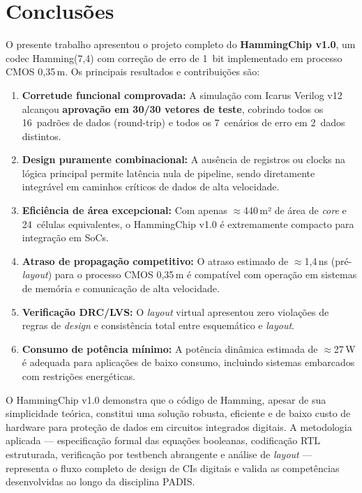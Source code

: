 \documentclass[12pt,a4paper]{article}
\begin{document}
\section{Conclusões}

O presente trabalho apresentou o projeto completo do \textbf{HammingChip v1.0}, um codec Hamming(7,4) com correção de erro de 1~bit implementado em processo CMOS 0,35\,\textmu m. Os principais resultados e contribuições são:

\begin{enumerate}[leftmargin=2em,label=\textbf{\arabic*.}]
  \item \textbf{Corretude funcional comprovada:} A simulação com Icarus Verilog v12 alcançou \textbf{aprovação em 30/30 vetores de teste}, cobrindo todos os 16~padrões de dados (round-trip) e todos os 7~cenários de erro em 2~dados distintos.

  \item \textbf{Design puramente combinacional:} A ausência de registros ou clocks na lógica principal permite latência nula de pipeline, sendo diretamente integrável em caminhos críticos de dados de alta velocidade.

  \item \textbf{Eficiência de área excepcional:} Com apenas $\approx$440\,\textmu m² de área de \textit{core} e 24~células equivalentes, o HammingChip v1.0 é extremamente compacto para integração em SoCs.

  \item \textbf{Atraso de propagação competitivo:} O atraso estimado de $\approx$1,4\,ns (pré-\textit{layout}) para o processo CMOS 0,35\,\textmu m é compatível com operação em sistemas de memória e comunicação de alta velocidade.

  \item \textbf{Verificação DRC/LVS:} O \textit{layout} virtual apresentou zero violações de regras de \textit{design} e consistência total entre esquemático e \textit{layout}.

  \item \textbf{Consumo de potência mínimo:} A potência dinâmica estimada de $\approx$27\,\textmu W é adequada para aplicações de baixo consumo, incluindo sistemas embarcados com restrições energéticas.
\end{enumerate}

O HammingChip v1.0 demonstra que o código de Hamming, apesar de sua simplicidade teórica, constitui uma solução robusta, eficiente e de baixo custo de hardware para proteção de dados em circuitos integrados digitais. A metodologia aplicada --- especificação formal das equações booleanas, codificação RTL estruturada, verificação por testbench abrangente e análise de \textit{layout} --- representa o fluxo completo de design de CIs digitais e valida as competências desenvolvidas ao longo da disciplina PADIS.
\end{document}
